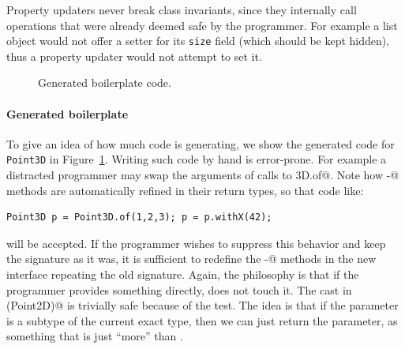 Property updaters never break class invariants, since they
internally call operations that were already deemed
safe by the programmer. For example a list object
would not offer a setter for its \texttt{size} field (which should be kept hidden), thus
a property updater would not attempt to set it.



\begin{figure}
\saveSpaceFig
\caption{Generated boilerplate code.}
\label{fig:boilerplate}
\saveSpaceFig
\end{figure}

\paragraph{Generated boilerplate}
To give an idea of how much code \mixin is generating, we show the
generated code for \texttt{Point3D} in Figure~\ref{fig:boilerplate}.
Writing such code by hand is error-prone. For
example a distracted programmer may swap the arguments of calls to
\Q@Point3D.of@.  Note how \Q@with-@ methods are automatically refined in their
return types, so that code like:

\begin{lstlisting}
Point3D p = Point3D.of(1,2,3); p = p.withX(42);
\end{lstlisting}

\noindent will be accepted. If the programmer wishes to suppress this behavior
and keep the signature as it was, it is sufficient to redefine the \Q@with-@
methods in the new interface repeating the old signature.  Again, the philosophy
is that if the programmer provides something directly, \mixin does not touch it.
The cast in \Q@with(Point2D)@ is trivially safe because of the \Q@instanceof@
test. The idea is that if the parameter is a subtype of the current exact type,
then we can just return the parameter, as something that is just ``more'' than
\Q@this@.

